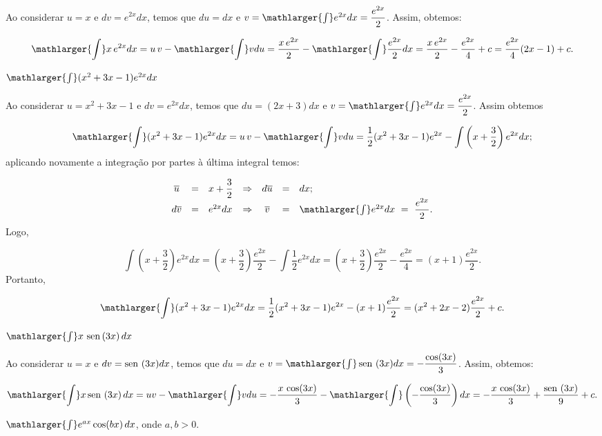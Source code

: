 \cleardoublepage\documentclass[../main.tex]{subfiles}
\begin{document}
\begin{exeresol}
\begin{compactenum}[a)]
  \begin{solution}
  Ao considerar \(u= x\) e \(dv =e^{2x}dx\), temos que \(du= dx\) e \(v=\mathlarger{\int}e^{2x}dx =\dfrac{e^{2x}}{2}\). Assim, obtemos:

\[ \mathlarger{\int}x\,e^{2x} dx= u\,v-\mathlarger{\int} v du= \dfrac{x\,e^{2x}}{2} - \mathlarger{\int}\dfrac{e^{2x}}{2} dx = \dfrac{x\,e^{2x}}{2} - \dfrac{e^{2x}}{4}+c = \dfrac{e^{2x}}{4}(2x-1)+c. \]

  \end{solution}
  \item \(\mathlarger{\int}(x^2+3x-1)e^{2x} dx\)
  
  \begin{solution}
  Ao considerar \(u= x^2+3x-1\) e \(dv =e^{2x}dx\), temos que \(du=(2x+3) dx\) e \(v=\mathlarger{\int}e^{2x}dx =\dfrac{e^{2x}}{2}\). Assim obtemos

\[ \mathlarger{\int}(x^2+3x-1)e^{2x} dx= u\,v-\mathlarger{\int} v du=\dfrac{1}{2}(x^2+3x-1) e^{2x}- \int\left(x+\dfrac{3}{2}\right) e^{2x} dx; \]
aplicando novamente a integração por partes à última integral temos:

\[ \begin{array}{cclcccl} \overline{u} &=& x+\dfrac{3}{2}&\Rightarrow &d\overline{u} &=& dx;\\ d\overline{v} &=&e^{2x}dx&\Rightarrow& \overline{v} &=& \mathlarger{\int}e^{2x}dx \,\, =\,\,\dfrac{e^{2x}}{2} . \end{array} \]
Logo,

\[ \int\left(x+\dfrac{3}{2}\right) e^{2x} dx = \left(x+\dfrac{3}{2}\right) \dfrac{e^{2x}}{2}-\int\dfrac{1}{2}e^{2x}dx = \left(x+\dfrac{3}{2}\right) \dfrac{e^{2x}}{2} - \dfrac{e^{2x}}{4}=(x+1)\dfrac{e^{2x}}{2}. \]
Portanto,

\[ \mathlarger{\int}(x^2+3x-1)e^{2x} dx= \dfrac{1}{2}(x^2+3x-1) e^{2x}- (x+1)\dfrac{e^{2x}}{2} = (x^2+2x-2)\dfrac{e^{2x}}{2}+c. \]
  \end{solution}
  \item \(\mathlarger{\int}x\, \sen (3x) \,dx\)
  
  \begin{solution}
  Ao considerar \(u= x\) e \(dv =\operatorname{sen}\,\, (3x)dx\), temos que \(du=dx\) e \(v=\mathlarger{\int}\sen\, (3x)dx =-\dfrac{\cos (3x)}{3}\). Assim, obtemos:

\[ \mathlarger{\int}x \sen\, (3x) \,dx = u v-\mathlarger{\int} v du= -\dfrac{x\,\cos (3x)}{3} - \mathlarger{\int}\left(- \dfrac{\cos (3x)}{3}\right) dx= -\dfrac{x\,\cos (3x)}{3} + \dfrac{\sen\, (3x)}{9}+c. \]
  \end{solution}
  \item \(\mathlarger{\int}e^{ax} \cos( bx) \,dx\), onde \(a,b>0\).
  

\end{compactenum}
\end{exeresol}
\end{document}
